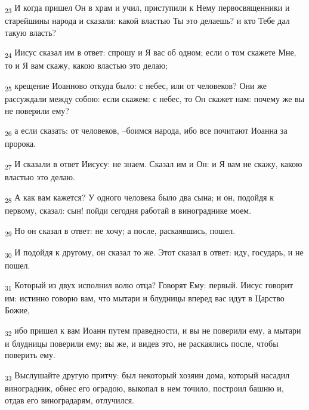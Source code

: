 \begin{tcolorbox}
\textsubscript{23} И когда пришел Он в храм и учил, приступили к Нему первосвященники и старейшины народа и сказали: какой властью Ты это делаешь? и кто Тебе дал такую власть?
\end{tcolorbox}
\begin{tcolorbox}
\textsubscript{24} Иисус сказал им в ответ: спрошу и Я вас об одном; если о том скажете Мне, то и Я вам скажу, какою властью это делаю;
\end{tcolorbox}
\begin{tcolorbox}
\textsubscript{25} крещение Иоанново откуда было: с небес, или от человеков? Они же рассуждали между собою: если скажем: с небес, то Он скажет нам: почему же вы не поверили ему?
\end{tcolorbox}
\begin{tcolorbox}
\textsubscript{26} а если сказать: от человеков, --боимся народа, ибо все почитают Иоанна за пророка.
\end{tcolorbox}
\begin{tcolorbox}
\textsubscript{27} И сказали в ответ Иисусу: не знаем. Сказал им и Он: и Я вам не скажу, какою властью это делаю.
\end{tcolorbox}
\begin{tcolorbox}
\textsubscript{28} А как вам кажется? У одного человека было два сына; и он, подойдя к первому, сказал: сын! пойди сегодня работай в винограднике моем.
\end{tcolorbox}
\begin{tcolorbox}
\textsubscript{29} Но он сказал в ответ: не хочу; а после, раскаявшись, пошел.
\end{tcolorbox}
\begin{tcolorbox}
\textsubscript{30} И подойдя к другому, он сказал то же. Этот сказал в ответ: иду, государь, и не пошел.
\end{tcolorbox}
\begin{tcolorbox}
\textsubscript{31} Который из двух исполнил волю отца? Говорят Ему: первый. Иисус говорит им: истинно говорю вам, что мытари и блудницы вперед вас идут в Царство Божие,
\end{tcolorbox}
\begin{tcolorbox}
\textsubscript{32} ибо пришел к вам Иоанн путем праведности, и вы не поверили ему, а мытари и блудницы поверили ему; вы же, и видев это, не раскаялись после, чтобы поверить ему.
\end{tcolorbox}
\begin{tcolorbox}
\textsubscript{33} Выслушайте другую притчу: был некоторый хозяин дома, который насадил виноградник, обнес его оградою, выкопал в нем точило, построил башню и, отдав его виноградарям, отлучился.
\end{tcolorbox}
